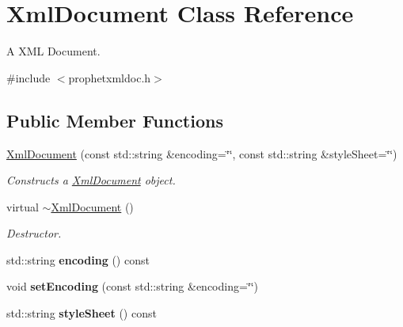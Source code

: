 \hypertarget{classXmlDocument}{
\section{XmlDocument Class Reference}
\label{classXmlDocument}
}


A XML Document.  




{\ttfamily \#include $<$prophetxmldoc.h$>$}

\subsection*{Public Member Functions}
\begin{DoxyCompactItemize}
\item 
\hyperlink{classXmlDocument_a3bc4c5ea5f22b4ff8776422125b31d42}{XmlDocument} (const std::string \&encoding=\char`\"{}\char`\"{}, const std::string \&styleSheet=\char`\"{}\char`\"{})
\begin{DoxyCompactList}\small\item\em Constructs a \hyperlink{classXmlDocument}{XmlDocument} object. \item\end{DoxyCompactList}\item 
\hypertarget{classXmlDocument_ab18742228f580a5e4ec87e4b39c8a68c}{
virtual \hyperlink{classXmlDocument_ab18742228f580a5e4ec87e4b39c8a68c}{$\sim$XmlDocument} ()}
\label{classXmlDocument_ab18742228f580a5e4ec87e4b39c8a68c}

\begin{DoxyCompactList}\small\item\em Destructor. \item\end{DoxyCompactList}\item 
\hypertarget{classXmlDocument_a5063b9dc310ed5ed7a38b77f8584a50c}{
std::string {\bfseries encoding} () const }
\label{classXmlDocument_a5063b9dc310ed5ed7a38b77f8584a50c}

\item 
\hypertarget{classXmlDocument_afb4401e77f67626533ba7409a011c508}{
void {\bfseries setEncoding} (const std::string \&encoding=\char`\"{}\char`\"{})}
\label{classXmlDocument_afb4401e77f67626533ba7409a011c508}

\item 
\hypertarget{classXmlDocument_ae0a7e5e1f28b179c31bee66481b18c03}{
std::string {\bfseries styleSheet} () const }
\label{classXmlDocument_ae0a7e5e1f28b179c31bee66481b18c03}


\end{DoxyCompactItemize}

